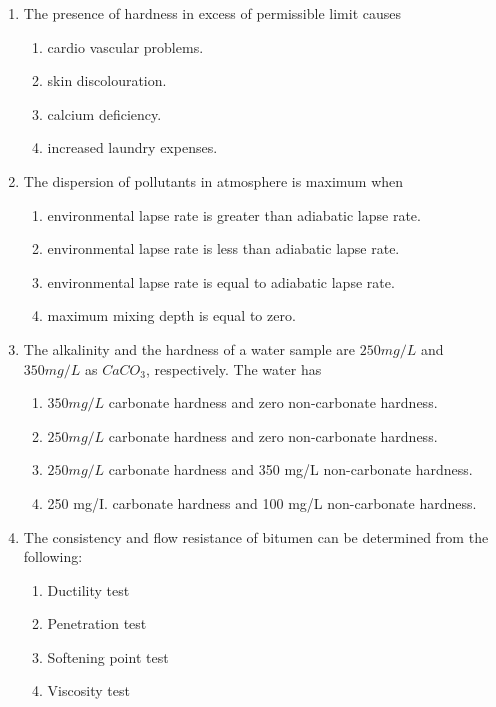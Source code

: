 \documentclass[journal,12pt,onecolumn]{IEEEtran}
\theoremstyle{remark}
\begin{document}
\begin{enumerate}
\item  The presence of hardness in excess of permissible limit causes

\hfill{}
\begin{enumerate}
\item cardio vascular problems.
\item skin discolouration.
\item calcium deficiency.
\item increased laundry expenses.
\end{enumerate}

\item The dispersion of pollutants in atmosphere is maximum when

\hfill{}
\begin{enumerate}
\item environmental lapse rate is greater than adiabatic lapse rate.
\item environmental lapse rate is less than adiabatic lapse rate. 
\item environmental lapse rate is equal to adiabatic lapse rate.
\item maximum mixing depth is equal to zero.
\end{enumerate}

\item The alkalinity and the hardness of a water sample are $250 mg/L$ and $350 mg/L$ as $CaCO_3$, respectively. The water has

\hfill{}
\begin{enumerate}
\item $350 mg/L$ carbonate hardness and zero non-carbonate hardness.
\item $250 mg/L$ carbonate hardness and zero non-carbonate hardness.
\item $250 mg/L$ carbonate hardness and 350 mg/L non-carbonate hardness.
\item 250 mg/I. carbonate hardness and 100 mg/L non-carbonate hardness.
\end{enumerate}

\item The consistency and flow resistance of bitumen can be determined from the following:

\hfill{}
\begin{enumerate}
\item Ductility test
\item Penetration test
\item Softening point test
\item Viscosity test
\end{enumerate}


\end{enumerate}
\end{document}
